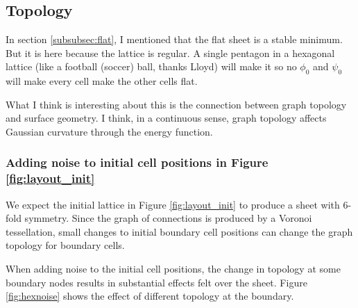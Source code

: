\subsection{Topology}

In section \ref{subsubsec:flat}, I mentioned that the flat sheet is a stable minimum. But it is here because the lattice is regular. A single pentagon in a hexagonal lattice (like a football (soccer) ball, thanks Lloyd) will make it so no $\phi_0$ and $\psi_0$ will make every cell make the other cells flat. 

What I think is interesting about this is the connection between graph topology and surface geometry. I think, in a continuous sense, graph topology affects Gaussian curvature through the energy function. 

\subsubsection{Adding noise to initial cell positions in Figure \ref{fig:layout_init}}

We expect the initial lattice in Figure \ref{fig:layout_init} to produce a sheet with 6-fold symmetry. Since the graph of connections is produced by a Voronoi tessellation, small changes to initial boundary cell positions can change the graph topology for boundary cells. 

When adding noise to the initial cell positions, the change in topology at some boundary nodes results in substantial effects felt over the sheet. Figure \ref{fig:hexnoise} shows the effect of different topology at the boundary.

